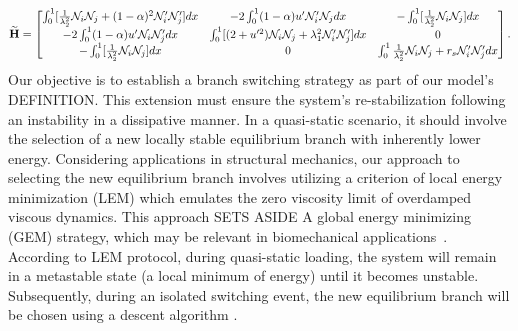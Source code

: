 \begin{equation}
    \widetilde{\mathbf{H}}=
    \begin{bmatrix}
    \int_0^1[ \frac{1}{\lambda_2^2}{\mathcal N}_i{\mathcal N}_j + (1-\alpha)^2{\mathcal N}'_i{\mathcal N}'_j] dx&
-2\int_0^1(1-\alpha)u' {\mathcal N}'_i {\mathcal N}_j  dx&
-\int_0^1[\frac{1}{\lambda_2^2}{\mathcal N}_i {\mathcal N}_j]  dx\\

-2\int_0^1(1-\alpha)u' {\mathcal N}_i {\mathcal N}'_j dx&
 \int_0^1 [ (2+u'^2){\mathcal N}_i{\mathcal N}_j +\lambda_1^2{\mathcal N}'_i{\mathcal N}'_j] dx&
 0\\

-\int_0^1[\frac{1}{\lambda_2^2}{\mathcal N}_i{\mathcal N}_j ] dx
&0
&\int_0^1\frac{1}{\lambda_2^2}{\mathcal N}_i {\mathcal N}_j+r_s{\mathcal N}'_i {\mathcal N}'_j  dx
\end{bmatrix}.
\label{eq:stifness2}
\end{equation}
Our objective is to establish a branch switching strategy as part of our model's DEFINITION. This extension must ensure the system's re-stabilization following an instability in a dissipative manner. In a quasi-static scenario, it should involve the selection of a new locally stable equilibrium branch with inherently lower energy.  Considering applications in structural mechanics, our approach to selecting the new equilibrium branch involves utilizing a criterion of local energy minimization (LEM)  which emulates the zero viscosity limit of overdamped viscous dynamics. This approach SETS ASIDE A global energy minimizing (GEM) strategy, which may be relevant in biomechanical applications~\cite{Salman2021-mn}. According to LEM protocol, during quasi-static loading, the system will remain in a metastable state (a local minimum of energy) until it becomes unstable. Subsequently, during an isolated switching event, the new equilibrium branch will be chosen using a descent algorithm \cite{Puglisi2005-lg}.
